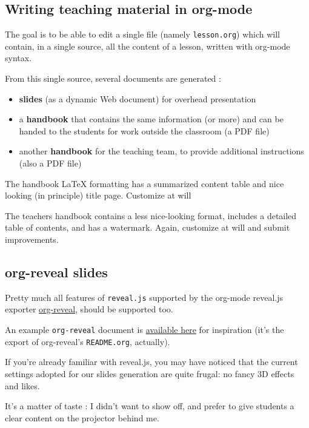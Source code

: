 \documentclass[a4paper]{article}
\begin{document}
\subsection{Writing teaching material in org-mode}
\label{sec:org33c98d7}

The goal is to be able to edit a single file (namely \texttt{lesson.org}) which will contain, in a single source, all the content of a lesson, written with org-mode syntax.

From this single source, several documents are generated :
\begin{itemize}
\item \textbf{slides} (as a dynamic Web document) for overhead presentation
\item a \textbf{handbook} that contains the same information (or more) and can be handed to the students for work outside the classroom (a PDF file)
\item another \textbf{handbook} for the teaching team, to provide additional instructions (also a PDF file)
\end{itemize}

\begin{NOTES}
The handbook \LaTeX{} formatting has a summarized content table and nice looking (in principle) title page. Customize at will

The teachers handbook contains a less nice-looking format, includes a detailed table of contents, and has a watermark. Again, customize at will and submit improvements.
\end{NOTES}

\subsection{org-reveal slides}
\label{sec:org9a3c9fb}

Pretty much all features of \texttt{reveal.js} supported by the org-mode reveal.js exporter \href{https://github.com/yjwen/org-reveal/}{org-reveal}, should be supported too.

An example \texttt{org-reveal} document is \href{./elisp/org-reveal/Readme.html}{available here} for inspiration (it's the export of org-reveal's \texttt{README.org}, actually).

\begin{NOTES}
If you're already familiar with reveal.js, you may have noticed that the current settings adopted for our slides generation are quite frugal: no fancy 3D effects and likes.

It's a matter of taste : I didn't want to show off, and prefer to give students a clear content on the projector behind me.
\end{NOTES}
\end{document}
